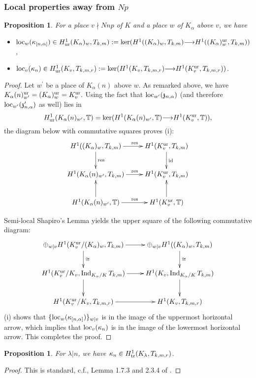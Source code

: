 \documentclass[12pt]{amsart}
\numberwithin{equation}{section}
\newtheorem{prop}[thm]{Proposition}
\begin{document}
\subsubsection{Local properties away from $Np$}
\begin{prop}
\label{prop:localgoodplaces}
For a place $v\nmid Nnp$ of $K$ and a place $w$ of $K_\alpha$ above $v$, we have
\begin{itemize}
\item[(i)] $\textup{loc}_w(\kappa_{[n,\alpha]}) \in H^1_{\textup{ur}}(K_\alpha)_w,T_{k,m}):=\ker(H^1((K_\alpha)_w,T_{k,m}){\longrightarrow} H^1((K_\alpha)_w^{\textup{ur}},T_{k,m}))$,
\item[(ii)] $\textup{loc}_v(\kappa_{n}) \in H^1_{\textup{ur}}(K_v,T_{k,m,r}):=\ker(H^1(K_v,T_{k,m,r}){\longrightarrow} H^1(K_v^{\textup{ur}},T_{k,m,r}))$.
\end{itemize}
\end{prop}
\begin{proof}
Let $w^\prime$ be a place of $K_\alpha(n)$ above $w$. As remarked above, we have $K_\alpha(n)_{w^\prime}^{\textup{ur}}=(K_\alpha)_w^{\textup{ur}}=K_v^{\textup{ur}}.$ Using the fact that
$\textup{loc}_{w^\prime}(\frak{z}_{n,\alpha})$ (and therefore $\textup{loc}_{w^\prime}(\frak{z}_{n,\alpha}^{\prime})$ as well) lies in
$$H^1_{\textup{ur}}(K_\alpha(n)_{w^\prime},{\mathbb{T}})=\ker(H^1(K_\alpha(n)_{w^\prime},{\mathbb{T}}){\longrightarrow} H^1(K_v^{\textup{ur}},{\mathbb{T}})),$$ the diagram below with commutative squares proves (i):
$$\xymatrix{H^1((K_\alpha)_w,T_{k,m})\ar[r]^(.55){\textup{res}} \ar[d]^{\textup{res}}& H^1(K_v^{\textup{ur}},T_{k,m})\ar[d]^{\textup{id}}\\
H^1(K_\alpha(n)_{w^\prime},T_{k,m})\ar[r]^(.55){\textup{res}} & H^1(K_v^{\textup{ur}},T_{k,m})\\
H^1(K_\alpha(n)_{w^\prime},{\mathbb{T}})\ar[r]^(.55){\textup{res}}\ar[u] & H^1(K_v^{\textup{ur}},{\mathbb{T}})\ar[u]
}$$

Semi-local Shapiro's Lemma yields the upper square of the following commutative diagram:
$$\xymatrix{
{\displaystyle\oplus_{w|v}} H^1(K_v^{\textup{ur}}/(K_\alpha)_w,T_{k,m})\ar[r] \ar[d]^{\cong}& {\displaystyle\oplus_{w|v}} H^1((K_\alpha)_w,T_{k,m}) \ar[d]^{\cong}\\
H^1(K_v^{\textup{ur}}/K_v,\textup{Ind}_{K_\alpha/K}\,T_{k,m})\ar[r] \ar[d]& H^1(K_v,\textup{Ind}_{K_\alpha/K}\,T_{k,m})\ar[d]\\
H^1(K_v^{\textup{ur}}/K_v,T_{k,m,r})\ar[r] & H^1(K_v,T_{k,m,r})
}$$
(i) shows that $\{\textup{loc}_w(\kappa_{[n,\alpha]})\}_{w|v}$ is in the image of the uppermost horizontal arrow, which implies that $\textup{loc}_v(\kappa_{n})$ is in the image of the lowermost horizontal arrow. This completes the proof.
\end{proof}
\begin{prop}
\label{prop:localdividingn}
For $\lambda|n$, we have $\kappa_n \in H^1_{\textup{tr}}(K_\lambda,T_{k,m,r})$.
\end{prop}
\begin{proof}
This is standard, c.f., Lemma 1.7.3 and 2.3.4 of \cite{howard-heegner1}.
\end{proof}
\end{document}
